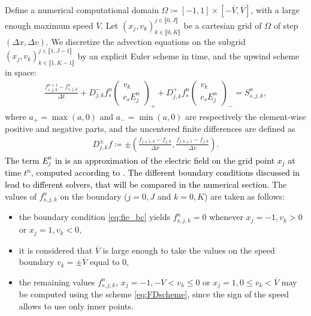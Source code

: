 \documentclass{article}
\numberwithin{equation}{section}
\newcommand{\todo}[1]{{\color{red}\textbf{#1}}}
\newcommand{\vv}[1]{\begin{pmatrix} #1 \end{pmatrix}} %
\begin{document}
Define a numerical computational domain $\Omega \coloneqq [-1,1] \times [-\overline{V},\overline{V}]$, with a large enough maximum speed $\overline{V}$. Let $(x_j, v_k)^{j\in\llbracket0,J\rrbracket}_{k\in\llbracket0,K\rrbracket}$ be a cartesian grid of $\Omega$ of step $(\Delta x, \Delta v)$. We discretize the advection equations on the subgrid $(x_j, v_k)^{j\in\llbracket1,J-1\rrbracket}_{k\in\llbracket1,K-1\rrbracket}$ by an explicit Euler scheme in time, and the upwind scheme in space:
\begin{align}\label{eq:FDscheme}
	\frac{f_{s,j,k}^{n+1} - f_{s,j,k}^{n}}{\Delta t} + D^-_{j,k} f_s^n \vv{v_k\\c_s E_j^n}_{+} +D^+_{j,k} f_s^n \vv{v_k\\c_s E_j^n}_{-} = S_{s,j,k}^n,
\end{align}
where $a_+ = \max(a,0)$ and $a_{-} = \min(a,0)$ are respectively the element-wise positive and negative parts, and the uncentered finite differences are defined as
\begin{align*}
	D^{\pm}_{j,k} f \coloneqq \pm \left(\frac{f_{j\pm 1,k} - f_{j,k}}{\Delta x}, \frac{f_{j,k\pm 1} - f_{j,k}}{\Delta v}\right).
\end{align*}
\textcolor{black}{The term $E_j^n$ in  is an approximation of the electric field on the grid point $x_j$ at time $t^n$, computed according to . The different boundary conditions discussed in  lead to different solvers, that will be compared in the numerical section.}
The values of $f_{s,j,k}^n$ on the boundary ($j=0, J$ and $k=0, K$) are taken as follows:
\begin{itemize}
\item the boundary condition \cref{eq:fie_bc} yields $f_{s,j,k}^n = 0$ whenever $x_j=-1, v_k > 0$ or $x_j=1, v_k < 0$,
\item it is considered that $\overline{V}$ is large enough to take the values on the speed boundary $v_k = \pm \overline{V}$ equal to 0,
\item the remaining values $f_{s,j,k}^n$, $x_j=-1, -\overline{V} < v_k \leqslant 0$ or $x_j=1, 0 \leqslant v_k < \overline{V}$ may be computed using the scheme \cref{eq:FDscheme}, since the sign of the speed allows to use only inner points.
\end{itemize}

\end{document}

